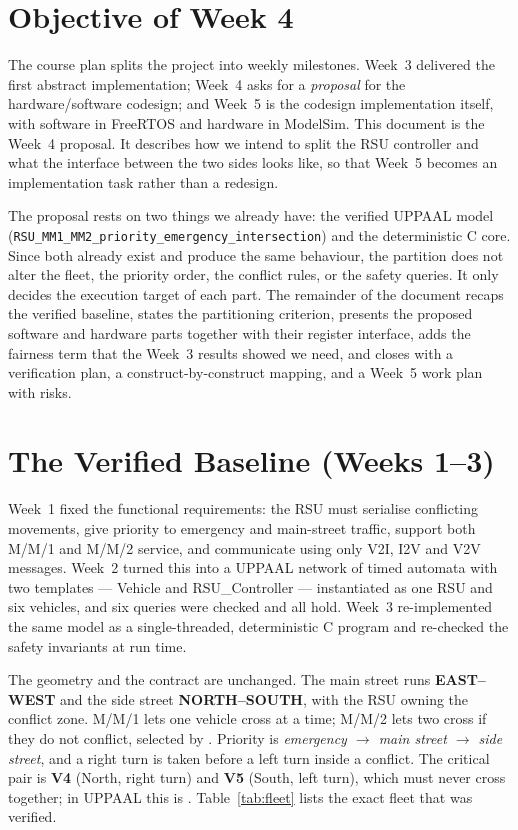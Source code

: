 \documentclass[11pt]{article}
\newcommand{\code}[1]{\texttt{\detokenize{#1}}}
\begin{document}
\section{Objective of Week 4}
The course plan splits the project into weekly milestones. Week~3 delivered the first abstract
implementation; Week~4 asks for a \emph{proposal} for the hardware/software codesign; and Week~5 is the
codesign implementation itself, with software in FreeRTOS and hardware in ModelSim. This document is the
Week~4 proposal. It describes how we intend to split the RSU controller and what the interface between
the two sides looks like, so that Week~5 becomes an implementation task rather than a redesign.

The proposal rests on two things we already have: the verified UPPAAL model
(\texttt{\small RSU\_MM1\_\allowbreak MM2\_\allowbreak priority\_\allowbreak emergency\_\allowbreak intersection}) and the deterministic C
core. Since both already
exist and produce the same behaviour, the partition does not alter the fleet, the priority order, the
conflict rules, or the safety queries. It only decides the execution target of each part. The remainder
of the document recaps the verified baseline, states the partitioning criterion, presents the proposed
software and hardware parts together with their register interface, adds the fairness term that the
Week~3 results showed we need, and closes with a verification plan, a construct-by-construct mapping,
and a Week~5 work plan with risks.

\section{The Verified Baseline (Weeks 1--3)}
Week~1 fixed the functional requirements: the RSU must serialise conflicting movements, give priority
to emergency and main-street traffic, support both M/M/1 and M/M/2 service, and communicate using only
V2I, I2V and V2V messages. Week~2 turned this into a UPPAAL network of timed automata with two
templates --- \textsf{Vehicle} and \textsf{RSU\_Controller} --- instantiated as one RSU and six
vehicles, and six queries were checked and all hold. Week~3 re-implemented the same model as a
single-threaded, deterministic C program and re-checked the safety invariants at run time.

The geometry and the contract are unchanged. The main street runs \textbf{EAST--WEST} and the side
street \textbf{NORTH--SOUTH}, with the RSU owning the conflict zone. M/M/1 lets one vehicle cross at a
time; M/M/2 lets two cross if they do not conflict, selected by \code{MM_MODE}. Priority is
\emph{emergency $\to$ main street $\to$ side street}, and a right turn is taken before a left turn inside
a conflict. The critical pair is \textbf{V4} (North, right turn) and \textbf{V5} (South, left turn),
which must never cross together; in UPPAAL this is \code{A[] not (crossing[4] && crossing[5])}.
Table~\ref{tab:fleet} lists the exact fleet that was verified.
\end{document}
